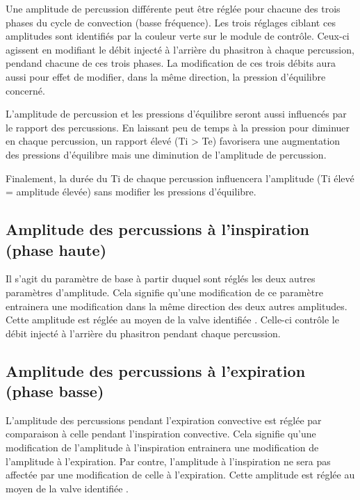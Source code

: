 Une amplitude de percussion différente peut être réglée pour chacune
	des trois phases du cycle de convection (basse fréquence). Les
	trois réglages ciblant ces amplitudes sont identifiés par la couleur
	verte sur le module de contrôle. Ceux-ci agissent en modifiant le
	débit injecté à l'arrière du phasitron à chaque percussion, pendand
	chacune de ces trois phases. La modification de ces trois débits
	aura aussi pour effet de modifier, dans la même direction, la
	pression d'équilibre concerné.

L'amplitude de percussion et les pressions d'équilibre seront aussi
	influencés par le rapport \ie des percussions. En laissant peu de
	temps à la pression pour diminuer en chaque percussion, un rapport
	\ie élevé (Ti > Te) favorisera une augmentation des pressions
	d'équilibre mais une diminution de l'amplitude de percussion.

Finalement, la durée du Ti de chaque percussion influencera
	l'amplitude (Ti élevé = amplitude élevée) sans modifier les
	pressions d'équilibre.

\subsection{Amplitude des percussions à l'inspiration (phase haute)}

Il s'agit du paramètre de base à partir duquel sont réglés les deux
	autres paramètres d'amplitude. Cela signifie qu'une modification de
	ce paramètre entrainera une modification dans la même direction des
	deux autres amplitudes.  Cette amplitude est réglée au moyen de la
	valve identifiée . Celle-ci contrôle le débit
	injecté à l'arrière du phasitron pendant chaque percussion.

\subsection{Amplitude des percussions à l'expiration (phase basse)}

L'amplitude des percussions pendant l'expiration convective est réglée
	par comparaison à celle pendant l'inspiration convective. Cela
	signifie qu'une modification de l'amplitude à l'inspiration
	entrainera une modification de l'amplitude à l'expiration. Par
	contre, l'amplitude à l'inspiration ne sera pas affectée par une
	modification de celle à l'expiration. Cette amplitude est réglée au
	moyen de la valve identifiée .

